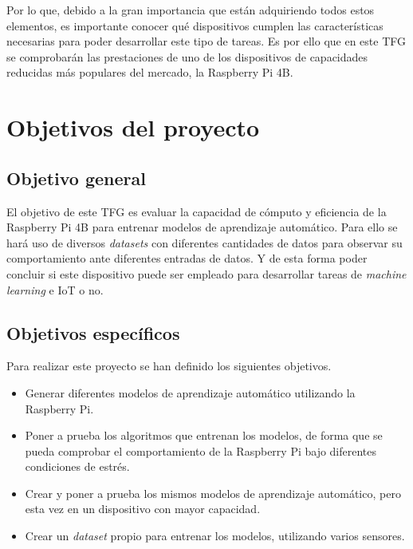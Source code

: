 \documentclass[a4paper, 12pt]{book}
\begin{document}
Por lo que, debido a la gran importancia que están adquiriendo todos estos elementos, es importante conocer qué dispositivos cumplen las características necesarias para poder desarrollar este tipo de tareas. Es por ello que en este TFG se comprobarán las prestaciones de uno de los dispositivos de capacidades reducidas más populares del mercado, la Raspberry Pi 4B. 



\section{Objetivos del proyecto}
\label{sec:objetivos}

\subsection{Objetivo general} %
\label{sec:objetivo-general} %


El objetivo de este TFG es evaluar la capacidad de cómputo y eficiencia de la Raspberry Pi 4B para entrenar modelos de aprendizaje automático. Para ello se hará uso de diversos \textit{datasets} con diferentes cantidades de datos para observar su comportamiento ante diferentes entradas de datos. Y de esta forma poder concluir si este dispositivo puede ser empleado para desarrollar tareas de \textit{machine learning} e IoT o no.


\subsection{Objetivos específicos}
\label{sec:objetivos-especificos}

Para realizar este proyecto se han definido los siguientes objetivos.

    \begin{itemize}
        \item Generar diferentes modelos de aprendizaje automático utilizando la Raspberry Pi.
        \item Poner a prueba los algoritmos que entrenan los modelos, de forma que se pueda comprobar el comportamiento de la Raspberry Pi bajo diferentes condiciones de estrés.
        \item Crear y poner a prueba los mismos modelos de aprendizaje automático, pero esta vez en un dispositivo con mayor capacidad.
        \item Crear un \textit{dataset} propio para entrenar los modelos, utilizando varios sensores.
    \end{itemize}
\end{document}
